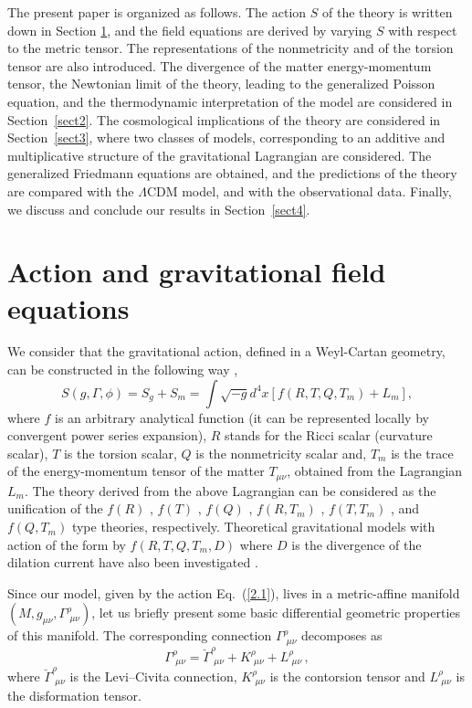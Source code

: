 \documentclass[aps,superscriptaddress, showpacs,preprintnumbers, superscriptaddress, nofootinbibt,twocolumn]{revtex4}
\newcommand{\te}[1]{\textcolor{black}{#1}}
\begin{document}
The present paper is organized as follows. The action $S$ of the theory is written down in Section \ref{sect1}, and the field equations are derived by varying $S$ with respect to the metric tensor. The representations of the nonmetricity and of the torsion tensor are also introduced. The divergence of the matter energy-momentum tensor, the Newtonian limit of the theory, leading to the generalized Poisson equation, and the thermodynamic interpretation of the model are considered in Section~\ref{sect2}. The cosmological implications of the theory are considered in Section~\ref{sect3}, where two classes of models, corresponding to an additive and multiplicative structure of the gravitational Lagrangian are considered. The generalized Friedmann equations are obtained, and the predictions of the theory are compared with the $\Lambda$CDM model, and with the observational data. Finally, we discuss and conclude our results in Section~\ref{sect4}.

\section{Action and gravitational field equations}\label{sect1}

We consider that the gravitational action, defined in a Weyl-Cartan geometry, can be constructed in the following way \te{\cite{M1,M1a,M1b,M1c}},
\begin{equation}\label{2.1}
S(g,\Gamma, \phi)=S_{g}+S_{m}=\int \sqrt{-g}d^{4}x \left[f\left(R,T,Q,T_m\right)+L_{m}\right],
\end{equation}
where $f$ is an arbitrary analytical function (it can be represented locally by convergent power series expansion), $R$ stands for the Ricci scalar (curvature scalar), $T$ is the torsion scalar, $Q$ is the nonmetricity scalar and,  $T_m$ is the trace of the energy-momentum tensor of the matter $T_{\mu \nu}$, obtained from the Lagrangian $L_{m}$. The theory derived from the above Lagrangian can be considered as the unification of the $f(R)$ \cite{Bu1}, $f(T)$ \cite{TE5}, $f(Q)$ \cite{Q2},  $f\left(R,T_m\right)$ \cite{fT1}, $f\left(T,T_m\right)$ \cite{fTT},  and $f\left(Q,T_m\right)$ \cite{fQC1, fQC2} type theories, respectively. Theoretical gravitational models with action of the form by $f(R,T,Q,T_m,D)$ where $D$ is the divergence of the dilation current have also been investigated \cite{M1a}.

Since our model, given by the action Eq.~(\ref{2.1}), lives in a metric-affine manifold $\left(M, g_{\mu\nu}, \Gamma^{\rho}_{\,\,\mu\nu}\right)$, let us briefly present some basic differential geometric properties of this manifold. The corresponding  connection $\Gamma^{\rho}_{\,\,\mu\nu}$ decomposes as
\begin{equation}
\Gamma^{\rho}_{\,\,\mu\nu}=\breve{\Gamma}_{\,\, \mu \nu}^{\rho}+K^{\rho}_{\,\,\mu\nu}+L^{\rho}_{\,\,\mu\nu}\,,
\end{equation}
where $\breve{\Gamma}_{\,\, \mu \nu}^{\rho}$ is the Levi--Civita connection,   $K^{\rho}_{\,\,\mu\nu}$  is  the  contorsion tensor and
$L^{\rho}_{\,\,\mu\nu}$ is  the disformation tensor.
\end{document}
